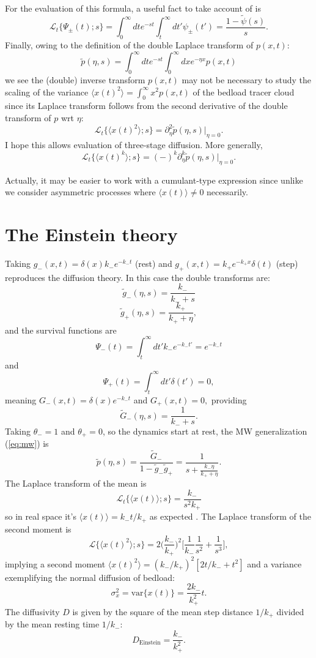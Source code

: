 \documentclass[11pt]{article}
\newcommand\be{\begin{equation}} %
\newcommand\ee{\end{equation}}   %
\newcommand\bra{\langle}
\newcommand\ket{\rangle}
\newcommand\El{\mathcal{L}}
\newcommand\tg{\tilde{g}}
\newcommand\tG{\tilde{G}}
\begin{document}
For the evaluation of this formula, a useful fact to take account of is 
\be \El_t\{ \Psi_\pm(t);s\} = \int_0^\infty dt e^{-st} \int_t^\infty dt' \psi_\pm(t') = \frac{1-\tilde{\psi}(s)}{s}. \ee
Finally, owing to the definition of the double Laplace transform of $p(x,t)$:
\be \tilde{p}(\eta,s) = \int_0^\infty dt e^{-st} \int_0^\infty dx e^{-\eta x} p(x,t)\ee
we see the (double) inverse transform $p(x,t)$ may not be necessary to study the scaling of the variance $\bra x(t)^2 \ket = \int_0^\infty x^2 p(x,t)$ of the bedload tracer cloud since its Laplace transform follows from the second derivative of the double transform of $p$ wrt $\eta$:
\be \El_t\{ \bra x(t)^2 \ket;s\} = \partial_\eta^2 \tilde{p}(\eta,s)\Big|_{\eta=0}. \label{eq:var}
\ee
I hope this allows evaluation of three-stage diffusion.
More generally, 
\be \El_t\{\bra x(t)^k\ket;s\} = (-)^k\partial_\eta^k \tilde{p}(\eta,s)\Big|_{\eta=0}.\ee

Actually, it may be easier to work with a cumulant-type expression since unlike \citet{Masoliver2016,Masoliver2017} we consider asymmetric processes where $\bra x(t) \ket \neq 0$ necessarily.

\section{The Einstein theory}
Taking $g_-(x,t) = \delta(x)k_- e^{-k_-t}$ (rest) and $g_+(x,t) = k_+ e^{-k_+ x}\delta(t) $ (step) reproduces the \citet{Einstein1937} diffusion theory.
In this case the double transforms are: 
\be \tilde{g}_-(\eta,s) = \frac{k_-}{k_-+s}\ee
\be \tilde{g}_+(\eta,s) = \frac{k_+}{k_++\eta}, \ee
and the survival functions are 
\be \Psi_-(t) = \int_t^\infty dt' k_-e^{-k_- t'} = e^{-k_- t} \ee
and 
\be \Psi_+(t) = \int_t^\infty dt' \delta(t') = 0 ,  \ee
meaning $G_-(x,t) = \delta(x) e^{-k_- t}$ and $G_+(x,t) = 0,$ providing
\be \tG_-(\eta,s) = \frac{1}{k_-+s}.\ee
Taking $\theta_-=1$ and $\theta_+=0$, so the dynamics start at rest, the MW generalization (\ref{eq:mw}) is
\be \tilde{p}(\eta, s) = \frac{\tG_-}{1-\tg_-\tg_+} = \frac{1}{s + \frac{k_- \eta}{k_+ + \eta }}.\label{eq:mwgen}\ee
The Laplace transform of the mean is 
\be \El_t\{\bra x(t) \ket;s\} = \frac{k_-}{s^2 k_+}
\ee
so in real space it's $\bra x(t) \ket = k_- t/k_+$ as expected \citep[e.g.][]{Einstein1937, Nakagawa1976}.
The Laplace transform of the second moment is 
\be \El \{\bra x(t)^2 \ket; s\} = 2\Big(\frac{k_-}{k_+}\Big)^2 \Big[ \frac{1}{k_-}\frac{1}{s^2} + \frac{1}{s^3}\Big], \ee
implying a second moment $\bra x(t)^2 \ket = (k_-/k_+)^2[2t/k_-+t^2] $
and a variance exemplifying the normal diffusion of bedload:
\be \sigma_x^2 = \text{var}\{x(t)\} = \frac{2k_-}{k_+^2}t.\ee
The diffusivity $D$ is given by the square of the mean step distance $1/k_+$ divided by the mean resting time $1/k_-$:
\be D_\text{Einstein} = \frac{k_-}{k_+^2}.\ee
\end{document}
